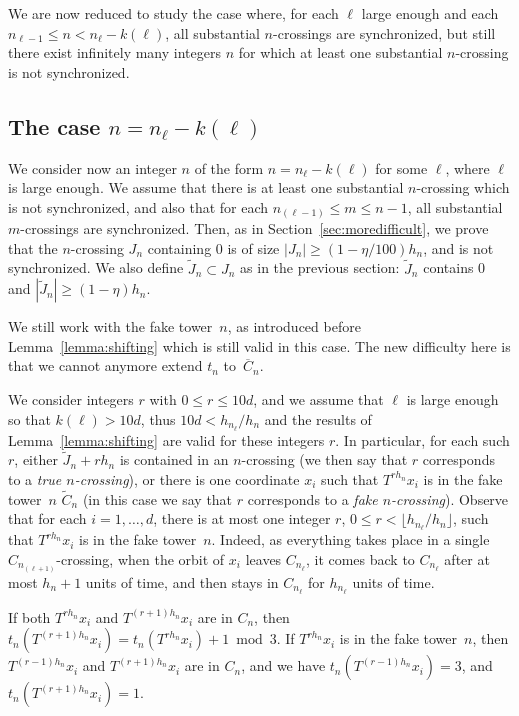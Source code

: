 \documentclass[AHL,Unicode,longabstracts]{cedram}
\begin{document}
We are now reduced to study the case where, for each $\ell$ large enough and each $n_{\ell-1}\le n < n_\ell-k(\ell)$, all substantial $n$-crossings are synchronized, but still there exist infinitely many integers $n$ for which at least one substantial $n$-crossing is not synchronized.



\subsection{The case \texorpdfstring{$n = n_\ell-k(\ell)$}{n = nl-k(l)}}\label{sec:thirdcase}

We consider now an integer $n$ of the form $n=n_\ell-k(\ell)$ for some $\ell$, where $\ell$ is large enough. We assume that there is at least one substantial $n$-crossing which is not synchronized, and also that for each $n_{(\ell-1)}\le m\le n-1$, all substantial $m$-crossings are synchronized. Then, as in Section~\ref{sec:moredifficult}, we prove that the $n$-crossing $J_n$ containing 0 is of size $|J_n|\ge (1-\eta/100)h_n$, and is not synchronized. We also define $\tilde J_n\subset J_n$ as in the previous section: $\tilde J_n$ contains 0 and $|\tilde J_n|\ge (1-\eta)h_n$.

We still work with the fake tower~$n$, as introduced before Lemma~\ref{lemma:shifting} which is still valid in this case. The new difficulty here is that we cannot anymore extend $t_n$ to~$\overline{C}_n$.

We consider integers $r$ with $0\le r\le 10d$, and we assume that $\ell$ is large enough so that $k(\ell)>10d$, thus $10d< h_{n_\ell}/h_n$ and the results of Lemma~\ref{lemma:shifting} are valid for these integers $r$. In particular, for each such $r$, either $\tilde J_n+rh_n$ is contained in an $n$-crossing (we then say that $r$ corresponds to a \emph{true $n$-crossing}), or there is one coordinate $x_i$ such that $T^{rh_n}x_i$ is in the fake tower~$n$ $\tilde C_n$ (in this case we say that $r$ corresponds to a \emph{fake $n$-crossing}). Observe that for each $i=1,\ldots,d$, there is at most one integer $r$, $0\le r < \lfloor h_{n_\ell}/h_n\rfloor$, such that $T^{rh_n}x_i$ is in the fake tower~$n$. Indeed, as everything takes place in a single $C_{n_{(\ell+1)}}$-crossing, when the orbit of $x_i$ leaves $C_{n_\ell}$, it comes back to $C_{n_\ell}$ after at most $h_n+1$ units of time, and then stays in $C_{n_\ell}$ for $h_{n_\ell}$ units of time.

If both $T^{rh_n}x_i$ and $T^{(r+1)h_n}x_i$ are in $C_n$, then $t_n(T^{(r+1)h_n}x_i)=t_n(T^{rh_n}x_i)+1 \bmod 3$. If $T^{rh_n}x_i$ is in the fake tower~$n$, then $T^{(r-1)h_n}x_i$ and $T^{(r+1)h_n}x_i$ are in $C_n$, and we have $t_n(T^{(r-1)h_n}x_i)=3$, and $t_n(T^{(r+1)h_n}x_i)=1$.
\end{document}

